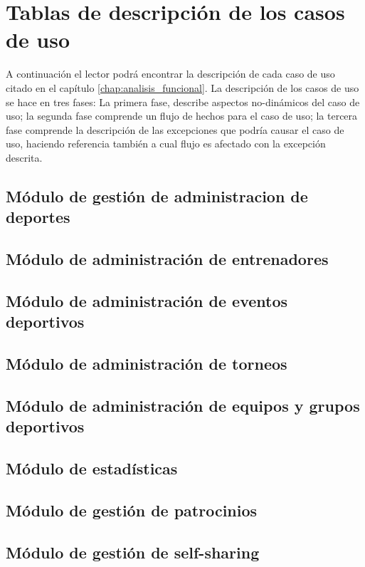 \section{Tablas de descripción de los casos de uso}

A continuación el lector podrá encontrar la descripción de cada caso de uso citado en el capítulo \ref{chap:analisis_funcional}. La descripción de los casos de uso se hace en tres fases: La primera fase, describe aspectos no-dinámicos del caso de uso; la segunda fase comprende un flujo de hechos para el caso de uso; la tercera fase comprende la descripción de las excepciones que podría causar el caso de uso, haciendo referencia también a cual flujo es afectado con la excepción descrita.

\subsection{Módulo de gestión de administracion de deportes}


\subsection{Módulo de administración de entrenadores}


\subsection{Módulo de administración de eventos deportivos}


\subsection{Módulo de administración de torneos}


\subsection{Módulo de administración de equipos y grupos deportivos}


\subsection{Módulo de estadísticas}


\subsection{Módulo de gestión de patrocinios}


\clearpage

\subsection{Módulo de gestión de self-sharing}
